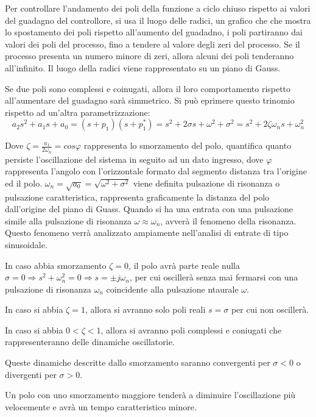 \documentclass{article}
\numberwithin{equation}{subsection}
\begin{document}
Per controllare l'andamento dei poli della funzione a ciclo chiuso rispetto ai valori del guadagno del controllore, si usa il luogo delle radici, un 
grafico che che mostra lo spostamento dei poli rispetto all'aumento del guadadno, i poli partiranno dai valori dei poli del processo, fino a tendere 
al valore degli zeri del processo. Se il processo presenta un numero minore di zeri, allora alcuni dei poli tenderanno all'infinito. 
Il luogo della radici viene rappresentato su un piano di Gauss. 


Se due poli sono complessi e coinugati, allora il loro comportamento rispetto all'aumentare del guadagno sarà simmetrico. Si può eprimere questo trinomio rispetto ad 
un'altra parametrizzazione:
\begin{equation}
    a_2s^2+a_1s+a_0=(s+p_1)(s+p_1^*)=s^2+2\sigma s+\omega^2+\sigma^2=s^2+2\zeta\omega_ns+\omega_n^2
\end{equation}


Dove $\zeta=\displaystyle\frac{a_1}{2\omega_n}=cos\varphi$ rappresenta lo smorzamento del polo, quantifica quanto persiste l'oscillazione del sistema in seguito ad un dato ingresso, 
dove $\varphi$ rappresenta l'angolo con l'orizzontale formato dal segmento distanza tra l'origine ed il polo.
$\omega_n=\displaystyle\sqrt{a_0}=\sqrt{\omega^2+\sigma^2}$ viene definita pulsazione di risonanza o pulsazione caratteristica, rappresenta graficamente la distanza del polo dall'origine 
del piano di Guass. Quando si ha una entrata con una pulsazione simile alla pulsazione di risonanza $\omega\approx\omega_n$, avverà il fenomeno della risonanza. Questo 
fenomeno verrà analizzato ampiamente nell'analisi di entrate di tipo sinusoidale. 


In caso abbia smorzamento $\zeta=0$, il polo avrà parte reale nulla $\sigma=0\Rightarrow s^2+\omega_n^2=0\Rightarrow s=\pm j\omega_n$, per cui 
oscillerà senza mai fermarsi con una pulsazione di risonanza $\omega_n$ coincidente alla pulsazione ntaurale $\omega$.

In caso si abbia $\zeta=1$, allora si avranno solo poli reali $s=\sigma$ per cui non oscillerà. 

In caso si abbia $0<\zeta<1$, allora si avranno poli complessi e coniugati che rappresenteranno delle dinamiche oscillatorie. 

Queste dinamiche descritte dallo smorzamento saranno convergenti per $\sigma<0$ o divergenti per $\sigma>0$. 

Un polo con uno smorzamento maggiore tenderà a diminuire l'oscillazione più velocemente e avrà un tempo caratteristico minore. 
\end{document}

